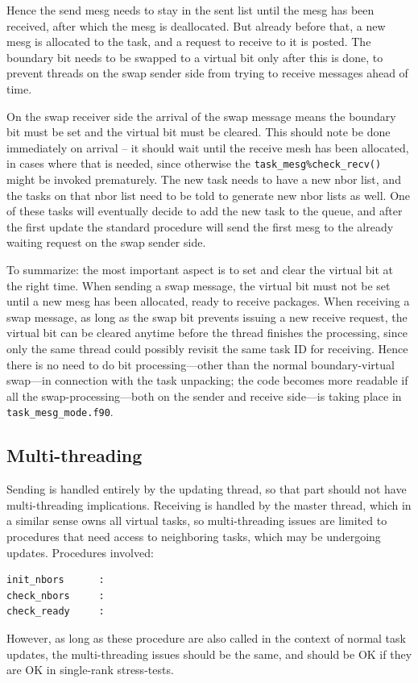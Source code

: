 \documentclass[paper=a4,fontsize=11pt]{scrartcl}
\numberwithin{equation}{section}		%
\numberwithin{figure}{section}			%
\numberwithin{table}{section}				%
\newcommand{\codecolor}{\color{Blue}}
\newcommand{\Code}[1]{{\codecolor\texttt{#1}}}
\begin{document}
Hence the send mesg needs to stay in the sent list until the mesg has been received, after which the mesg is deallocated.  But already before that, a new mesg is allocated to the task, and a request to receive to it is posted.  The boundary bit needs to be swapped to a virtual bit only after this is done, to prevent threads on the swap sender side from trying to receive messages ahead of time.

On the swap receiver side the arrival of the swap message means the boundary bit must be set and the virtual bit must be cleared. This should note be done immediately on arrival -- it should wait until the receive mesh has been allocated, in cases where that is needed, since otherwise the \Code{task\_mesg\%check\_recv()} might be invoked prematurely.  The new task needs to have a new nbor list, and the tasks on that nbor list need to be told to generate new nbor lists as well.   One of these tasks will eventually decide to add the new task to the queue, and after the first update the standard procedure will send the first mesg to the already waiting request on the swap sender side.

To summarize: the most important aspect is to set and clear the virtual bit at the right time.  When sending a swap message, the virtual bit must not be set until a new mesg has been allocated, ready to receive packages.   When receiving a swap message, as long as the swap bit prevents issuing a new receive request, the virtual bit can be cleared anytime before the thread finishes the processing, since only the same thread could possibly revisit the same task ID for receiving.  Hence there is no need to do bit processing---other than the normal boundary-virtual swap---in connection with the task unpacking; the code becomes more readable if all the swap-processing---both on the sender and receive side---is taking place in \Code{task\_mesg\_mode.f90}.

\subsection{Multi-threading}
Sending is handled entirely by the updating thread, so that part should not have multi-threading implications. Receiving is handled by the master thread, which in a similar sense owns all virtual tasks, so multi-threading issues are limited to procedures that need access to neighboring tasks, which may be undergoing updates.  Procedures involved:
{\codecolor\small\begin{verbatim}
init_nbors      :
check_nbors     :
check_ready     :
\end{verbatim}}
However, as long as these procedure are also called in the context of normal task updates, the multi-threading issues should be the same, and should be OK if they are OK in single-rank stress-tests.
\end{document}
